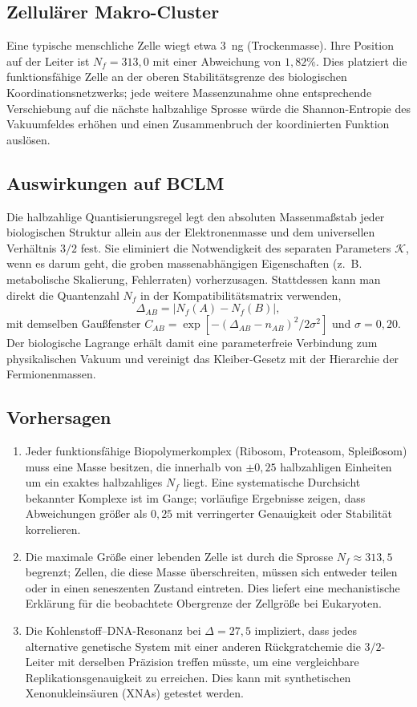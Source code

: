 \documentclass[12pt,a4paper]{article}
\newcommand{\REL}{\mathcal{K}}          %
\begin{document}
	\subsection{Zellulärer Makro-Cluster}
	Eine typische menschliche Zelle wiegt etwa 3~ng (Trockenmasse). Ihre Position auf der Leiter ist \(N_f = 313,0\) mit einer Abweichung von \(1,82\%\). Dies platziert die funktionsfähige Zelle an der oberen Stabilitätsgrenze des biologischen Koordinationsnetzwerks; jede weitere Massenzunahme ohne entsprechende Verschiebung auf die nächste halbzahlige Sprosse würde die Shannon-Entropie des Vakuumfeldes erhöhen und einen Zusammenbruch der koordinierten Funktion auslösen.
	
	\subsection{Auswirkungen auf BCLM}
	Die halbzahlige Quantisierungsregel legt den absoluten Massenmaßstab jeder biologischen Struktur allein aus der Elektronenmasse und dem universellen Verhältnis \(3/2\) fest. Sie eliminiert die Notwendigkeit des separaten Parameters \(\REL\), wenn es darum geht, die groben massenabhängigen Eigenschaften (z.~B. metabolische Skalierung, Fehlerraten) vorherzusagen. Stattdessen kann man direkt die Quantenzahl \(N_f\) in der Kompatibilitätsmatrix verwenden,
	\[
	\Delta_{AB} = |N_f(A) - N_f(B)|,
	\]
	mit demselben Gaußfenster \(C_{AB} = \exp[-(\Delta_{AB} - n_{AB})^2/2\sigma^2]\) und \(\sigma=0,20\). Der biologische Lagrange erhält damit eine parameterfreie Verbindung zum physikalischen Vakuum und vereinigt das Kleiber-Gesetz mit der Hierarchie der Fermionenmassen.
	
	\subsection{Vorhersagen}
	\begin{enumerate}
		\item Jeder funktionsfähige Biopolymerkomplex (Ribosom, Proteasom, Spleißosom) muss eine Masse besitzen, die innerhalb von \(\pm 0,25\) halbzahligen Einheiten um ein exaktes halbzahliges \(N_f\) liegt. Eine systematische Durchsicht bekannter Komplexe ist im Gange; vorläufige Ergebnisse zeigen, dass Abweichungen größer als \(0,25\) mit verringerter Genauigkeit oder Stabilität korrelieren.
		\item Die maximale Größe einer lebenden Zelle ist durch die Sprosse \(N_f \approx 313,5\) begrenzt; Zellen, die diese Masse überschreiten, müssen sich entweder teilen oder in einen seneszenten Zustand eintreten. Dies liefert eine mechanistische Erklärung für die beobachtete Obergrenze der Zellgröße bei Eukaryoten.
		\item Die Kohlenstoff–DNA-Resonanz bei \(\Delta = 27,5\) impliziert, dass jedes alternative genetische System mit einer anderen Rückgratchemie die \(3/2\)-Leiter mit derselben Präzision treffen müsste, um eine vergleichbare Replikationsgenauigkeit zu erreichen. Dies kann mit synthetischen Xenonukleinsäuren (XNAs) getestet werden.
	\end{enumerate}
	
\end{document}
